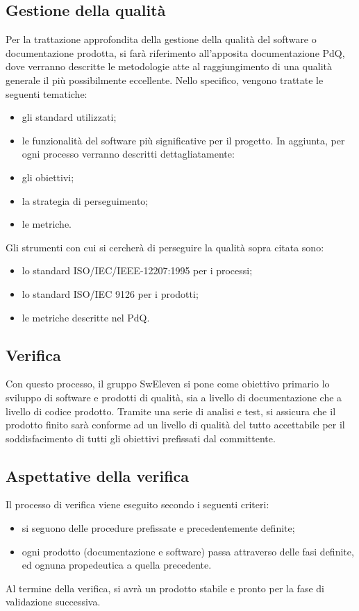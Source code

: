 \subsection{Gestione della qualità}
Per la trattazione approfondita della gestione della qualità del software o documentazione prodotta, si farà riferimento all’apposita documentazione PdQ, dove verranno descritte le metodologie atte al raggiungimento di una qualità generale il più possibilmente eccellente. Nello specifico, vengono trattate le seguenti tematiche:
\begin{itemize}
	\item gli standard utilizzati;
	\item le funzionalità del software più significative per il progetto. 
In aggiunta, per ogni processo verranno descritti dettagliatamente:
	\item gli obiettivi;
	\item la strategia di perseguimento;
	\item le metriche.
\end{itemize}
Gli strumenti con cui si cercherà di perseguire la qualità sopra citata sono:
\begin{itemize}
	\item lo standard ISO/IEC/IEEE-12207:1995 per i processi;
	\item lo standard ISO/IEC 9126 per i prodotti;
	\item le metriche descritte nel PdQ.
\end{itemize}

\subsection{Verifica}
Con questo processo, il gruppo SwEleven si pone come obiettivo primario lo sviluppo di software e prodotti di qualità, sia a livello di documentazione che a livello di codice prodotto. Tramite una serie di analisi e test, si assicura che il prodotto finito sarà conforme ad un livello di qualità del tutto accettabile per il soddisfacimento di tutti gli obiettivi prefissati dal committente. 
\subsection{Aspettative della verifica}
Il processo di verifica viene eseguito secondo i seguenti criteri:
\begin{itemize}
	\item si seguono delle procedure prefissate e precedentemente definite;
	\item ogni prodotto (documentazione e software) passa attraverso delle fasi definite, ed ognuna propedeutica a quella precedente.
	\end{itemize}
Al termine della verifica, si avrà un prodotto stabile e pronto per la fase di validazione successiva.

